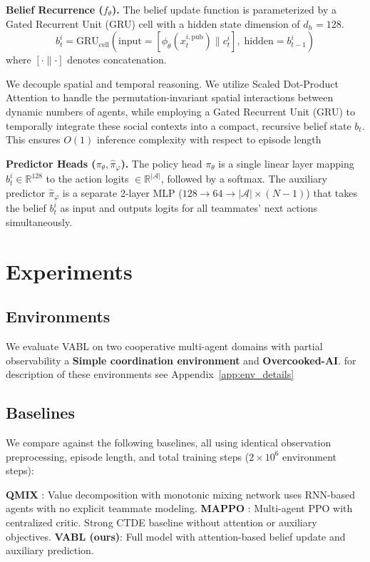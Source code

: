 \documentclass{article}
\theoremstyle{plain}
\theoremstyle{definition}
\theoremstyle{remark}
\begin{document}
\textbf{Belief Recurrence ($f_\theta$).}
The belief update function is parameterized by a Gated Recurrent Unit (GRU) cell with a hidden state dimension of $d_h = 128$.
\[ b_t^i = \mathrm{GRU}_{\mathrm{cell}}\left( \text{input} = [\phi_\theta(x_t^{i,\mathrm{pub}}) \parallel c_t^i], \; \text{hidden} = b_{t-1}^i \right) \]
where $[\cdot \parallel \cdot]$ denotes concatenation.

We decouple spatial and temporal reasoning. We utilize Scaled Dot-Product Attention to handle the permutation-invariant spatial interactions between dynamic numbers of agents, while employing a Gated Recurrent Unit (GRU) to temporally integrate these social contexts into a compact, recursive belief state $b_t$. This ensures $O(1)$ inference complexity with respect to episode length

\textbf{Predictor Heads ($\pi_\theta, \hat{\pi}_\varphi$).}
The policy head $\pi_\theta$ is a single linear layer mapping $b_t^i \in \mathbb{R}^{128}$ to the action logits $\in \mathbb{R}^{|\mathcal{A}|}$, followed by a softmax. The auxiliary predictor $\hat{\pi}_\varphi$ is a separate 2-layer MLP ($128 \to 64 \to |\mathcal{A}| \times (N{-}1)$) that takes the belief $b_t^i$ as input and outputs logits for all teammates' next actions simultaneously.



\section{Experiments}
\label{sec:experiments}

\subsection{Environments}
We evaluate VABL on two cooperative multi-agent domains with partial observability a \textbf{Simple coordination environment} and \textbf{Overcooked-AI}. for description of these environments see Appendix~\ref{app:env_details}

\subsection{Baselines}
We compare against the following baselines, all using identical observation preprocessing, episode length, and total training steps ($2 \times 10^6$ environment steps):

\textbf{QMIX} \cite{rashid2020monotonic}: Value decomposition with monotonic mixing network uses RNN-based agents with no explicit teammate modeling.
\textbf{MAPPO} \cite{yu2022surprising}: Multi-agent PPO with centralized critic. Strong CTDE baseline without attention or auxiliary objectives.
\textbf{VABL (ours)}: Full model with attention-based belief update and auxiliary prediction.
\end{document}
